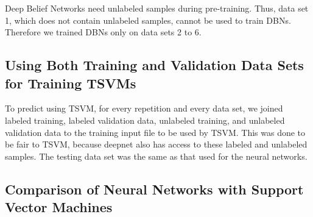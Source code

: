 Deep Belief Networks need unlabeled samples during pre-training. Thus,
data set 1, which does not contain unlabeled samples, cannot be used
to train DBNs. Therefore we trained DBNs only on data sets 2 to 6.

\subsection{Using Both Training and Validation Data Sets for Training TSVMs}

To predict using TSVM, for every repetition and every data set, we
joined labeled training, labeled validation data, unlabeled training,
and unlabeled validation data to the training input file to be used
by TSVM. This was done to be fair to TSVM, because deepnet also has
access to these labeled and unlabeled samples. The testing data set
was the same as that used for the neural networks.

\subsection{Comparison of Neural Networks with Support Vector Machines\label{subsec:Comparison-of-Neuronal-Networks-with-Support-Vector-Machines}}

